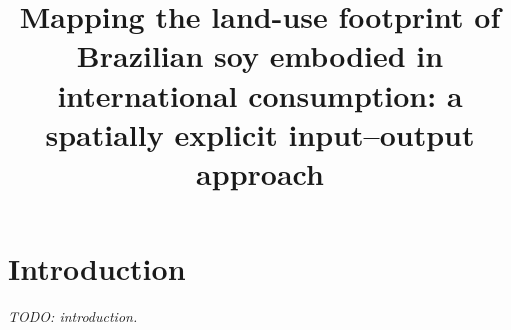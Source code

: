 \documentclass[pdflatex,sn-nature]{sn-jnl}%
\begin{document}
\title[Land-use footprint of Brazilian soy]{Mapping the land-use footprint
of Brazilian soy embodied in international consumption: a spatially explicit
input--output approach}

\author*[1]{\fnm{} \sur{}}\email{}




\maketitle

\section{Introduction}\label{sec:intro}
\emph{TODO: introduction.}







\appendix



%
\end{document}
